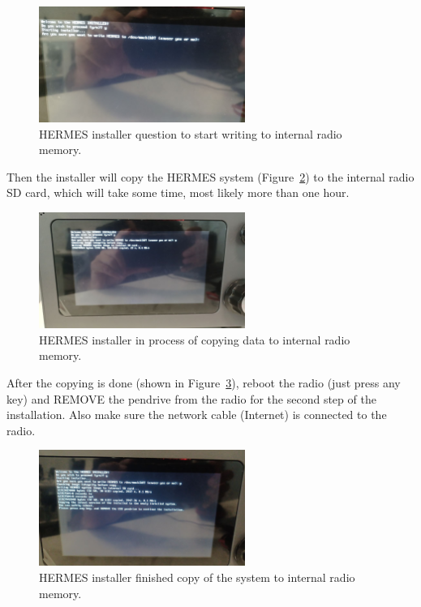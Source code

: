 \documentclass[11pt,a4paper]{article}
\begin{document}
\begin{figure}[H]
  \centering
  \includegraphics[width=0.6\textwidth]{pictures/inst-2.jpg}
  \caption{HERMES installer question to start writing to internal radio memory.}
  \label{fig:inst2}
\end{figure}

Then the installer will copy the HERMES system (Figure~\ref{fig:inst3}) to the internal radio SD card, which will take some time, most likely more than one hour.

\begin{figure}[H]
  \centering
  \includegraphics[width=0.6\textwidth]{pictures/inst-3.jpg}
  \caption{HERMES installer in process of copying data to internal radio memory.}
  \label{fig:inst3}
\end{figure}

After the copying is done (shown in Figure~\ref{fig:inst4}), reboot the radio (just press any key) and REMOVE the pendrive from the radio
for the second step of the installation. Also make sure the network cable (Internet) is connected to the radio.

\begin{figure}[H]
  \centering
  \includegraphics[width=0.6\textwidth]{pictures/inst-4.jpg}
  \caption{HERMES installer finished copy of the system to internal radio memory.}
  \label{fig:inst4}
\end{figure}
\end{document}
